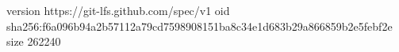 version https://git-lfs.github.com/spec/v1
oid sha256:f6a096b94a2b57112a79cd7598908151ba8c34e1d683b29a866859b2e5febf2e
size 262240

